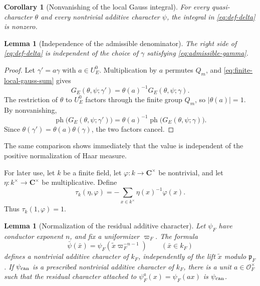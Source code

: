 \documentclass[11pt]{amsart}
\newtheorem{lemma}[theorem]{Lemma}
\newtheorem{corollary}[theorem]{Corollary}
\theoremstyle{definition}
\theoremstyle{remark}
\newcommand{\C}{\mathbf C}
\newcommand{\cO}{\mathcal O}
\newcommand{\p}{\mathfrak p}
\newcommand{\ph}{\operatorname{ph}}
\begin{document}
\begin{corollary}[Nonvanishing of the local Gauss integral]
\label{cor:local-gauss-integral-nonzero}
For every quasi-character $\theta$ and every nontrivial additive
character $\psi$, the integral in \eqref{eq:def-delta} is nonzero.
\end{corollary}

\begin{lemma}[Independence of the admissible denominator]
\label{lem:gamma-independent}
The right side of \eqref{eq:def-delta} is independent of the choice of
$\gamma$ satisfying \eqref{eq:admissible-gamma}.
\end{lemma}

\begin{proof}
Let $\gamma'=a\gamma$ with $a\in U_E^0$.  Multiplication by $a$
permutes $Q_m$, and \eqref{eq:finite-local-gauss-sum} gives
\[
 G_E(\theta,\psi;\gamma')
 =\theta(a)^{-1}G_E(\theta,\psi;\gamma).
\]
The restriction of $\theta$ to $U_E^0$ factors through the finite group
$Q_m$, so $|\theta(a)|=1$.  By nonvanishing,
\[
 \ph\bigl(G_E(\theta,\psi;\gamma')\bigr)
 =\theta(a)^{-1}
  \ph\bigl(G_E(\theta,\psi;\gamma)\bigr).
\]
Since $\theta(\gamma')=\theta(a)\theta(\gamma)$, the two factors
cancel.
\end{proof}

The same comparison shows immediately that the value is independent of
the positive normalization of Haar measure.

For later use, let $k$ be a finite field, let
$\varphi:k\to\C^\times$ be nontrivial, and let
$\eta:k^\times\to\C^\times$ be multiplicative.  Define
\begin{equation}\label{eq:tau-definition}
 \tau_k(\eta,\varphi)
 =-\sum_{x\in k^\times}\eta(x)^{-1}\varphi(x).
\end{equation}
Thus $\tau_k(1,\varphi)=1$.

\begin{lemma}[Normalization of the residual additive character]
\label{lem:residual-normalization}
Let $\psi_F$ have conductor exponent $n$, and fix a uniformizer
$\varpi_F$.  The formula
\[
 \bar\psi(\bar x)
 =\psi_F(\widetilde x\varpi_F^{-n-1})
 \qquad(\bar x\in k_F)
\]
defines a nontrivial additive character of $k_F$, independently of the
lift $\widetilde x$ modulo $\p_F$.  If $\psi_{\rm can}$ is a
prescribed nontrivial additive character of $k_F$, there is a unit
$a\in\cO_F^\times$ such that the residual character attached to
$\psi_F^a(x)=\psi_F(ax)$ is $\psi_{\rm can}$.
\end{lemma}
\end{document}
